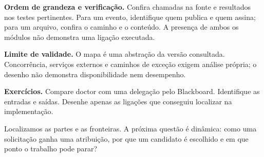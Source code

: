 \begin{resultado}
\textbf{Ordem de grandeza e verificação.} Confira chamadas na fonte e resultados nos testes pertinentes. Para um evento, identifique quem publica e quem assina; para um arquivo, confira o caminho e o conteúdo. A presença de ambos os módulos não demonstra uma ligação executada.
\end{resultado}

\begin{aviso}
\textbf{Limite de validade.} O mapa é uma abstração da versão consultada. Concorrência, serviços externos e caminhos de exceção exigem análise própria; o desenho não demonstra disponibilidade nem desempenho.
\end{aviso}

\begin{resultado}
\textbf{Exercícios.} Compare doctor com uma delegação pelo Blackboard. Identifique as entradas e saídas. Desenhe apenas as ligações que conseguiu localizar na implementação.
\end{resultado}





Localizamos as partes e as fronteiras. A próxima questão é dinâmica: como uma solicitação ganha uma atribuição, por que um candidato é escolhido e em que ponto o trabalho pode parar?
